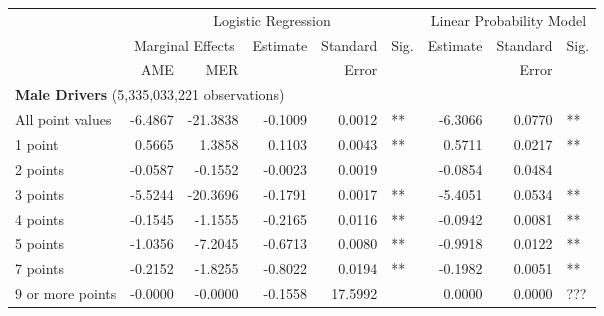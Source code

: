 
\begin{table}%
\centering 
\begin{tabular}{l r r r r l r r l} 

\hline 
 
 & \multicolumn{5}{c}{Logistic Regression}  & \multicolumn{3}{c}{Linear Probability Model} \\ 

 \cmidrule(lr){2-6}\cmidrule(lr){7-9} 
 & \multicolumn{2}{c}{Marginal Effects} & Estimate & Standard & Sig. & Estimate & Standard & Sig. \\ 

 \cmidrule(lr){2-3} 
 &   AME & MER &          &  Error   &      &          &  Error   &     \\ 

\hline 
 
\multicolumn{8}{l}{\textbf{Male Drivers} (5,335,033,221 observations)} \\ 

All point values                &  -6.4867        &  -21.3838       &  -0.1009        &  0.0012       &   **       &  -6.3066        &  0.0770       &   **       \\ 
1 point                         &  0.5665        &  1.3858       &  0.1103        &  0.0043       &   **       &  0.5711        &  0.0217       &   **       \\ 
2 points                        &  -0.0587        &  -0.1552       &  -0.0023        &  0.0019       &            &  -0.0854        &  0.0484       &            \\ 
3 points                        &  -5.5244        &  -20.3696       &  -0.1791        &  0.0017       &   **       &  -5.4051        &  0.0534       &   **       \\ 
4 points                        &  -0.1545        &  -1.1555       &  -0.2165        &  0.0116       &   **       &  -0.0942        &  0.0081       &   **       \\ 
5 points                        &  -1.0356        &  -7.2045       &  -0.6713        &  0.0080       &   **       &  -0.9918        &  0.0122       &   **       \\ 
7 points                        &  -0.2152        &  -1.8255       &  -0.8022        &  0.0194       &   **       &  -0.1982        &  0.0051       &   **       \\ 
9 or more points                &  -0.0000        &  -0.0000       &  -0.1558        &  17.5992       &            &  0.0000        &  0.0000       &  ???       \\ 


\end{tabular}
\end{table}
